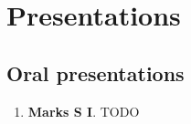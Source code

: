 
\chapter*{Presentations}  

\section*{Oral presentations}

\begin{enumerate}
      \item \textbf{Marks S I}. TODO
\end{enumerate}
